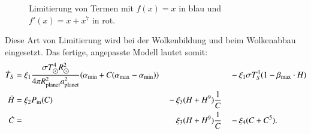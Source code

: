 \begin{refsection}
\begin{figure}
	\caption{Limitierung von Termen mit $f(x) = x$ in blau und $f'(x) = x + x^7$ in rot.}
	\label{planeten:limit_graph}
\end{figure}
Diese Art von Limitierung wird bei der Wolkenbildung und beim Wolkenabbau eingesetzt. Das fertige, angepasste Modell lautet somit:
\begin{equation}
\begin{aligned}
\dot{T}_S
&=
\xi_1 \displaystyle\frac{\sigma T_{\astrosun}^4 R_{\astrosun}^2}{4 \pi R_{\text{planet}}^2 a_{\text{planet}}^2} (\alpha_{\text{min}} + C(\alpha_{\text{max}} - \alpha_{\text{min}})) &
	&&
		&-\xi_1 \sigma T_{S}^4  (1 - \beta_{\text{max}} \cdot H)\\
\dot{H}  
&=
\xi_2 P_{\text{in}}(C)&
	&-\xi_3 (H + H^9) \frac{1}{C}   &                   \\
\dot{C}
&=&
	&\quad\hspace{0.27mm}\xi_3 (H + H^9) \frac{1}{C}&
		& - \xi_4 (C + C^5)
\text{.}
\end{aligned}
\end{equation}


\end{refsection}
